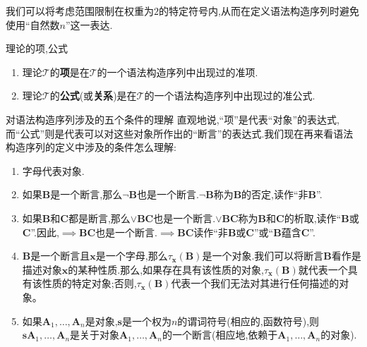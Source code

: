 \begin{remark}{}{}
	我们可以将考虑范围限制在权重为$2$的特定符号内,从而在定义语法构造序列时避免使用``自然数$n$''这一表达.
\end{remark}

\begin{definition}{理论的项,公式}{}
	\begin{enumerate}
		\item 理论$\mathcal{T}$的\textbf{项}是在$\mathcal{T}$的一个语法构造序列中出现过的准项.
		\item 理论$\mathcal{T}$的\textbf{公式}(或\textbf{关系})是在$\mathcal{T}$的一个语法构造序列中出现过的准公式.
	\end{enumerate}
\end{definition}

\begin{remark}{对语法构造序列涉及的五个条件的理解}{}
	直观地说,``项''是代表``对象''的表达式,而``公式''则是代表可以对这些对象所作出的``断言''的表达式.我们现在再来看语法构造序列的定义中涉及的条件怎么理解:
	\begin{enumerate}
		\item 字母代表对象.
		\item 如果$\boldsymbol{B}$是一个断言,那么$\neg\boldsymbol{B}$也是一个断言.$\neg\boldsymbol{B}$称为$\boldsymbol{B}$的否定,读作``非$\boldsymbol{B}$''.
		\item 如果$\boldsymbol{B}$和$\boldsymbol{C}$都是断言,那么$\vee\boldsymbol{B}\boldsymbol{C}$也是一个断言.$\vee\boldsymbol{B}\boldsymbol{C}$称为$\boldsymbol{B}$和$\boldsymbol{C}$的析取,读作``$\boldsymbol{B}$或$\boldsymbol{C}$''.因此,$\implies\boldsymbol{B}\boldsymbol{C}$也是一个断言.$\implies\boldsymbol{B}\boldsymbol{C}$读作``非$\boldsymbol{B}$或$\boldsymbol{C}$''或``$\boldsymbol{B}$蕴含$\boldsymbol{C}$''.
		\item $\boldsymbol{B}$是一个断言且$\boldsymbol{x}$是一个字母,那么$\tau_{\boldsymbol{x}}\left(\boldsymbol{B}\right)$是一个对象.我们可以将断言$\boldsymbol{B}$看作是描述对象$\boldsymbol{x}$的某种性质.那么,如果存在具有该性质的对象,$\tau_{\boldsymbol{x}}\left(\boldsymbol{B}\right)$就代表一个具有该性质的特定对象;否则,$\tau_{\boldsymbol{x}}\left(\boldsymbol{B}\right)$代表一个我们无法对其进行任何描述的对象。
		\item 如果$\boldsymbol{A}_{1},\ldots,\boldsymbol{A}_{n}$是对象,$\boldsymbol{s}$是一个权为$n$的谓词符号(相应的,函数符号),则$\boldsymbol{s}\boldsymbol{A}_{1},\ldots,\boldsymbol{A}_{n}$是关于对象$\boldsymbol{A}_{1},\ldots,\boldsymbol{A}_{n}$的一个断言(相应地,依赖于$\boldsymbol{A}_{1},\ldots,\boldsymbol{A}_{n}$的对象).
	\end{enumerate}
\end{remark}

